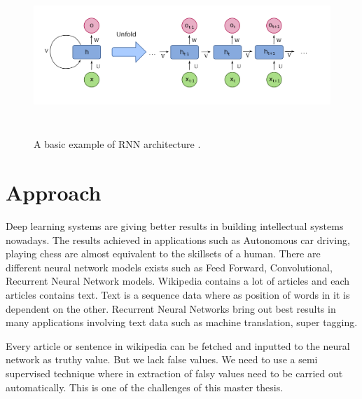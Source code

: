 \documentclass[a4paper, 11pt]{article}
\begin{document}

\begin{figure}[htpb]
    \centering
    \includegraphics[width=\textwidth,height=6cm,keepaspectratio=true]
    {Recurrent_neural_network_unfold.png}
    \caption{
        A basic example of RNN architecture \cite{WikipediaEN_RNN_unfold}.
    }
    \label{fig:A basic RNN architecture}
\end{figure}

\section{Approach}

Deep learning systems are giving better results in building intellectual systems nowadays.\cite{Goldberg2016} The results achieved in applications such as Autonomous car driving, playing chess are almost equivalent to the skillsets of a human. There are different neural network models exists such as Feed Forward, Convolutional, Recurrent Neural Network models. Wikipedia contains a lot of articles and each articles contains text. Text is a sequence data where as position of words in it is dependent on the other. Recurrent Neural Networks bring out best results in many applications involving text data such as machine translation, super tagging.

Every article or sentence in wikipedia can be fetched and inputted to the neural network as truthy value. But we lack false values. We need to use a semi supervised technique where in extraction of falsy values need to be carried out automatically. This is one of the challenges of this master thesis. 
\end{document}
